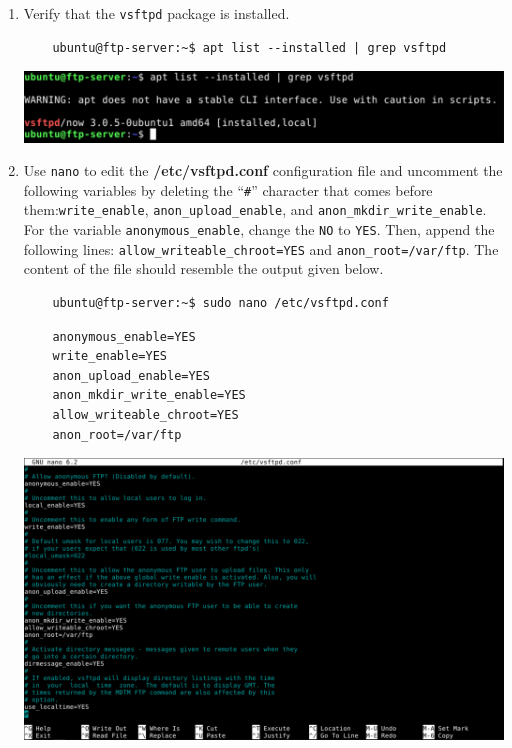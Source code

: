 \documentclass[letterpaper, 12pt]{article}
\begin{document}
\begin{enumerate}
    \item Verify that the \texttt{vsftpd} package is installed.
    \begin{lstlisting}
    ubuntu@ftp-server:~$ apt list --installed | grep vsftpd
    \end{lstlisting}

    \begin{center}
        \includegraphics[width=\linewidth]{images/part1/step42.png}
    \end{center}

    \item Use \texttt{nano} to edit the \textbf{/etc/vsftpd.conf} configuration file and uncomment the following
    variables by deleting the ``\texttt{\#}'' character that comes before them:\texttt{write\_enable},
    \texttt{anon\_upload\_enable}, and \texttt{anon\_mkdir\_write\_enable}. For the variable \texttt{anonymous\_enable},
    change the \texttt{NO} to \texttt{YES}. Then, append the following lines:
    \texttt{allow\_writeable\_chroot=YES} and \texttt{anon\_root=/var/ftp}. The content of the file should resemble the
    output given below.
    \begin{lstlisting}
    ubuntu@ftp-server:~$ sudo nano /etc/vsftpd.conf
    \end{lstlisting}
    \begin{lstlisting}
    anonymous_enable=YES
    write_enable=YES
    anon_upload_enable=YES
    anon_mkdir_write_enable=YES
    allow_writeable_chroot=YES
    anon_root=/var/ftp
    \end{lstlisting}

    \begin{center}
        \includegraphics[width=\linewidth]{images/part1/step43.png}
    \end{center}


\end{enumerate}
\end{document}
